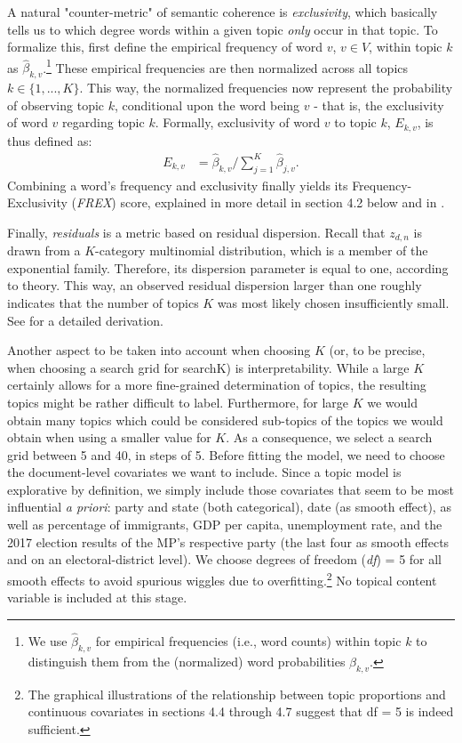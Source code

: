 \documentclass[12pt]{article}
\begin{document}
A natural "counter-metric" of semantic coherence is \textit{exclusivity}, which basically tells us to which degree words within a given topic \textit{only} occur in that topic. To formalize this, first define the empirical frequency of word $v$, $v\in{V}$, within topic $k$ as $\hat{\beta}_{k,v}$.\footnote{We use $\hat{\beta}_{k,v}$ for empirical frequencies (i.e., word counts) within topic $k$ to distinguish them from the (normalized) word probabilities $\beta_{k,v}$.} These empirical frequencies are then normalized across all topics $k\in\{1,...,K\}$. This way, the normalized frequencies now represent the probability of observing topic $k$, conditional upon the word being $v$ - that is, the exclusivity of word $v$ regarding topic $k$. Formally, exclusivity of word $v$ to topic $k$, $E_{k,v}$, is thus defined as:
\begin{align*}
E_{k,v} &= \hat{\beta}_{k,v}/\sum_{j=1}^{K}\hat{\beta}_{j,v}.
\end{align*}
Combining a word's frequency and exclusivity finally yields its Frequency-Exclusivity (\textit{FREX}) score, explained in more detail in section 4.2 below and in \cite{bischof2012summarizing}.

Finally, \textit{residuals} is a metric based on residual dispersion. Recall that $z_{d,n}$ is drawn from a $K$-category multinomial distribution, which is a member of the exponential family. Therefore, its dispersion parameter is equal to one, according to theory. This way, an observed residual dispersion larger than one roughly indicates that the number of topics $K$ was most likely chosen insufficiently small. See \cite{taddy2012estimation} for a detailed derivation.

Another aspect to be taken into account when choosing $K$ (or, to be precise, when choosing a search grid for searchK) is interpretability. While a large $K$ certainly allows for a more fine-grained determination of topics, the resulting topics might be rather difficult to label. Furthermore, for large $K$ we would obtain many topics which could be considered sub-topics of the topics we would obtain when using a smaller value for $K$. As a consequence, we select a search grid between 5 and 40, in steps of 5. Before fitting the model, we need to choose the document-level covariates we want to include. Since a topic model is explorative by definition, we simply include those covariates that seem to be most influential \textit{a priori}: party and state (both categorical), date (as smooth effect), as well as percentage of immigrants, GDP per capita, unemployment rate, and the 2017 election results of the MP's respective party (the last four as smooth effects and on an electoral-district level). We choose degrees of freedom (\textit{df}) = 5 for all smooth effects to avoid spurious wiggles due to overfitting.\footnote{The graphical illustrations of the relationship between topic proportions and continuous covariates in sections 4.4 through 4.7 suggest that df = 5 is indeed sufficient.} No topical content variable is included at this stage.
\end{document}
